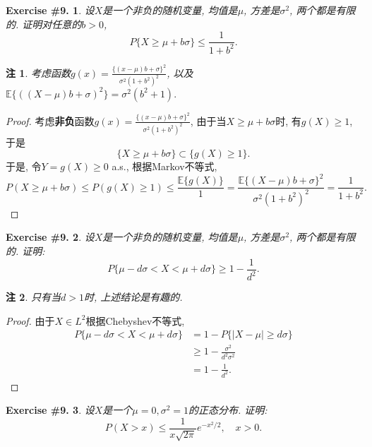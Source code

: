 \documentclass[UTF8, a4paper]{article}
\newtheorem{exercise}{Exercise \#9.}
\newtheorem*{remark}{注}
\begin{document}
\begin{framed}
\begin{exercise}
设\(X\)是一个非负的随机变量, 均值是\(\mu\), 方差是\(\sigma^2\), 两个都是有限的.
证明对任意的\(b>0\), 
$$
P\{X \geq \mu+b \sigma\} \leq \frac{1}{1+b^2}.
$$
\end{exercise}
\end{framed}

\begin{remark}
考虑函数\(g(x) = \frac{\{(x-\mu)b + \sigma\}^2}{\sigma^2(1+b^2)^2}\), 以及\(\mathbb{E}\{((X-\mu)b + \sigma)^2\} = \sigma^2 (b^2+1).\)
\end{remark}

\begin{proof}
考虑{\bf 非负}函数\(g(x) = \frac{\{(x-\mu)b + \sigma\}^2}{\sigma^2(1+b^2)^2}\), 
由于当\(X \geq \mu +  b \sigma\)时, 有\(g(X) \geq 1\), 于是
$$
\{X \geq \mu + b \sigma\} \subset \{g(X) \geq 1\}.
$$
于是, 令\(Y = g(X) \geq 0\) a.s., 根据Markov不等式, 
$$
P(X \geq \mu + b \sigma) \leq P(g(X) \geq 1) \leq \frac{\mathbb{E}\{g(X)\}}{1} = \frac{\mathbb{E}\{(X-\mu)b + \sigma\}^2}{\sigma^2(1+b^2)^2} = \frac{1}{1+b^2}.
$$
\end{proof}


\begin{framed}
\begin{exercise}
设\(X\)是一个非负的随机变量, 均值是\(\mu\), 方差是\(\sigma^2\), 两个都是有限的.
证明: 
$$
P\{\mu-d \sigma<X<\mu+d \sigma\} \geq 1-\frac{1}{d^2}.
$$
\end{exercise}
\end{framed}

\begin{remark}
只有当\(d>1\)时, 上述结论是有趣的.
\end{remark}

\begin{proof}
由于\(X \in L^2\)根据Chebyshev不等式,
$$
\begin{aligned}
    P\{\mu-d \sigma<X<\mu+d \sigma\} &= 1 - P\{|X - \mu| \geq d\sigma\} \\
    &\geq 1 - \frac{\sigma^2}{d^2\sigma^2} \\
    &= 1 - \frac{1}{d^2}.
\end{aligned}
$$
\end{proof}


\begin{framed}
\begin{exercise}
设\(X\)是一个\(\mu = 0, \sigma^2 = 1\)的正态分布.
证明: 
$$
P(X > x) \leq \frac{1}{x\sqrt{2\pi}}e^{-x^2/2}, \quad x > 0.
$$
\end{exercise}
\end{framed}
\end{document}
